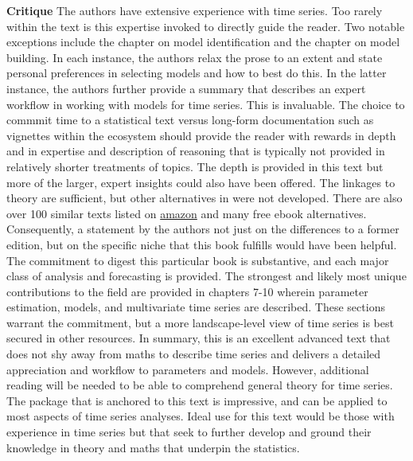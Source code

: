 \documentclass[bookreview]{jss}
\begin{document}
\textbf{Critique} \newline
The authors have extensive experience with time series. Too rarely within the text is this expertise invoked to directly guide the reader. Two notable exceptions include the chapter on model identification and the chapter on model building. In each instance, the authors relax the prose to an extent and state personal preferences in selecting models and how to best do this. In the latter instance, the authors further provide a summary that describes an expert workflow in working with models for time series. This is invaluable. The choice to commmit time to a statistical text versus long-form documentation such as vignettes within the  ecosystem should provide the reader with rewards in depth and in expertise and description of reasoning that is typically not provided in relatively shorter treatments of topics. The depth is provided in this text but more of the larger, expert insights could also have been offered. The linkages to theory are sufficient, but other alternatives in  were not developed. There are also over 100 similar texts listed on \href{https://amazon.com}{amazon} and many free ebook alternatives. Consequently, a statement by the authors not just on the differences to a former edition, but on the specific niche that this book fulfills would have been helpful. The commitment to digest this particular book is substantive, and each major class of analysis and forecasting is provided. The strongest and likely most unique contributions to the field are provided in chapters 7-10 wherein parameter estimation, models, and multivariate time series are described. These sections warrant the commitment, but a more landscape-level view of time series is best secured in other resources. In summary, this is an excellent advanced text that does not shy away from maths to describe time series and delivers a detailed appreciation and workflow to parameters and models. However, additional reading will be needed to be able to comprehend general theory for time series. The  package  that is anchored to this text is impressive, and can be applied to most aspects of time series analyses. Ideal use for this text would be those with experience in time series but that seek to further develop and ground their knowledge in theory and maths that underpin the statistics.


\end{document}
